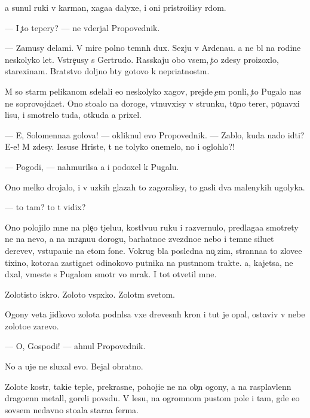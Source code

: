 \documentclass[10pt]{book}
\begin{document}
{\Y}a sunul ruki v karman{\yi}, xaga{\y}a dalyxe, i oni pristro{\y}ilisy r{\ia}dom.

— I {\c}to tepery? — ne v{\yi}derjal Propovednik.

— Za{\y}musy delami. V mire polno temn{\yi}h dux. S{\y}ezju v Ardenau. {\Y}a ne b{\yi}l na rodine neskolyko let. Vstre{\c}usy s Gertrudo{\y}. Rasskaju obo vsem, {\c}to zdesy proizoxlo, stare{\y}xinam. Bratstvo doljno b{\yi}ty gotovo k nepri{\y}atnost{\ia}m.

M{\yi} so star{\yi}m pelikanom sdelali {\y}e{\x}o neskolyko xagov, prejde {\c}em pon{\ia}li, {\c}to Pugalo nas ne soprovojda{\y}et. Ono sto{\y}alo na doroge, v{\yi}t{\ia}nuvxisy v strunku, to{\c}no ter{\y}er, po{\c}u{\y}avxi{\y} lisu, i smotrelo tuda, otkuda {\y}a prixel.

— E{\y}, Solomenna{\y}a golova! — okliknul {\y}evo Propovednik. — Zab{\yi}lo, kuda nado idti? E-e{\y}! M{\yi} zdesy. Iesuse Hriste, t{\yi} ne tolyko onemelo, no i oglohlo?!

— Pogodi, — nahmurilsa {\y}a i podoxel k Pugalu.

Ono melko drojalo, i v uzkih glazah to zagoralisy, to gasli dva malenykih ugolyka.

— {\C}to tam? {\C}to t{\yi} vidix?

Ono polojilo mne na ple{\c}o t{\ia}jelu{\y}u, kostl{\ia}vu{\y}u ruku i razvernulo, predlaga{\y}a smotrety ne na nevo, a na mra{\c}nu{\y}u dorogu, barhatno{\y}e zvezdno{\y}e nebo i temn{\yi}{\y}e siluet{\yi} derev{\y}ev, v{\yi}stupa{\y}u{\x}i{\y}e na etom fone. Vokrug b{\yi}la posledn{\ia}{\y}a no{\c} zim{\yi}, stranna{\y}a to{\y} zlove{\x}e{\y} tixino{\y}, kotora{\y}a zastiga{\y}et odinokovo putnika na pust{\yi}nnom trakte. {\Y}a, kajetsa, ne d{\yi}xal, vmeste s Pugalom smotr{\ia} vo mrak. I tot otvetil mne.

Zolotisto{\y} iskro{\y}. Zoloto{\y} vsp{\yi}xko{\y}. Zolot{\yi}m svetom.

Ogony {\q}veta jidkovo zolota podn{\ia}lsa v{\yi}xe drevesn{\yi}h kron i tut je opal, ostaviv v nebe zoloto{\y}e zarevo.

— O, Gospodi! — ahnul Propovednik.

No {\y}a uje ne sluxal {\y}evo. Bejal obratno.



Zolot{\yi}{\y}e kostr{\yi}, taki{\y}e tepl{\yi}{\y}e, prekrasn{\yi}{\y}e, pohoji{\y}e ne na ob{\yi}{\c}n{\yi}{\y} ogony, a na rasplavlenn{\yi}{\y} drago{\q}enn{\yi}{\y} metall, goreli povs{\iu}du. V lesu, na ogromnom pustom pole i tam, gde {\y}e{\x}o sovsem nedavno sto{\y}ala stara{\y}a ferma.
\end{document}
